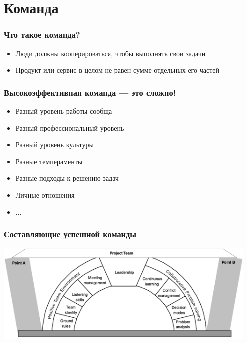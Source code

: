 \documentclass{../../slides-style}
\begin{document}
    \begin{frame}[plain]
        \titlepage
    \end{frame}

    \section{Команда}

    \begin{frame}
        \frametitle{Что такое команда?}
        \begin{itemize}
            \item Люди должны кооперироваться, чтобы выполнять свои задачи
            \item Продукт или сервис в целом не равен сумме отдельных его частей
        \end{itemize}
    \end{frame}

    \begin{frame}
        \frametitle{Высокоэффективная команда --- это сложно!}
        \begin{itemize}
            \item Разный уровень работы сообща
            \item Разный профессиональный уровень
            \item Разный уровень культуры
            \item Разные темпераменты
            \item Разные подходы к решению задач
            \item Личные отношения
            \item ...
        \end{itemize}
    \end{frame}

    \begin{frame}
        \frametitle{Составляющие успешной команды}
        \begin{center}
            \includegraphics[width=0.95\textwidth]{successfulTeamComponents.png}
        \end{center}
    \end{frame}
\end{document}
